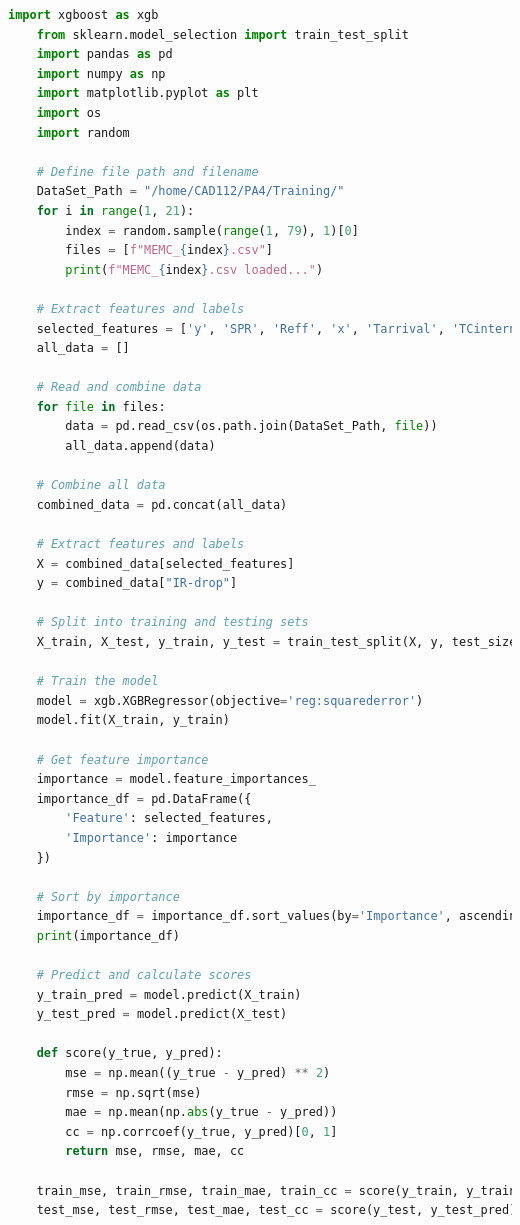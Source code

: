 \documentclass{article}
\begin{document}
\begin{lstlisting}[language={python}, caption={Features sort by importance}, label={sort}]
    import xgboost as xgb
    from sklearn.model_selection import train_test_split
    import pandas as pd
    import numpy as np
    import matplotlib.pyplot as plt
    import os
    import random
    
    # Define file path and filename
    DataSet_Path = "/home/CAD112/PA4/Training/"
    for i in range(1, 21):
        index = random.sample(range(1, 79), 1)[0]
        files = [f"MEMC_{index}.csv"] 
        print(f"MEMC_{index}.csv loaded...")
    
    # Extract features and labels
    selected_features = ['y', 'SPR', 'Reff', 'x', 'Tarrival', 'TCinternal', 'w', 'Cell type', 'Pinternal', 'Pleak', 'Ipeak', 'Ttransition', 'Cload']
    all_data = []
    
    # Read and combine data
    for file in files:
        data = pd.read_csv(os.path.join(DataSet_Path, file))
        all_data.append(data)
    
    # Combine all data
    combined_data = pd.concat(all_data)
    
    # Extract features and labels
    X = combined_data[selected_features]
    y = combined_data["IR-drop"]
    
    # Split into training and testing sets
    X_train, X_test, y_train, y_test = train_test_split(X, y, test_size=0.2, random_state=9527)
    
    # Train the model
    model = xgb.XGBRegressor(objective='reg:squarederror')
    model.fit(X_train, y_train)
    
    # Get feature importance
    importance = model.feature_importances_
    importance_df = pd.DataFrame({
        'Feature': selected_features,
        'Importance': importance
    })
    
    # Sort by importance
    importance_df = importance_df.sort_values(by='Importance', ascending=False)
    print(importance_df)
    
    # Predict and calculate scores
    y_train_pred = model.predict(X_train)
    y_test_pred = model.predict(X_test)
    
    def score(y_true, y_pred):
        mse = np.mean((y_true - y_pred) ** 2)
        rmse = np.sqrt(mse)
        mae = np.mean(np.abs(y_true - y_pred))
        cc = np.corrcoef(y_true, y_pred)[0, 1]
        return mse, rmse, mae, cc
    
    train_mse, train_rmse, train_mae, train_cc = score(y_train, y_train_pred)
    test_mse, test_rmse, test_mae, test_cc = score(y_test, y_test_pred)
    

\end{lstlisting}
\end{document}
